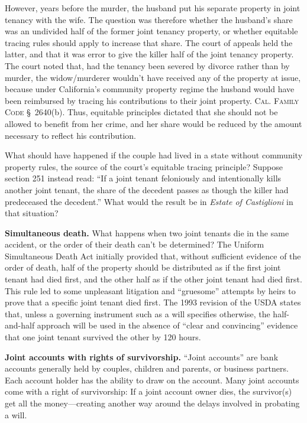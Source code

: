However, years before the murder, the husband put his separate property in joint
tenancy with the wife. The question was therefore whether the husband's share
was an undivided half of the former joint tenancy property, or whether
equitable tracing rules should apply to increase that share. The court of
appeals held the latter, and that it was error to give the killer half of the
joint tenancy property. The court noted that, had the tenancy been severed by
divorce rather than by murder, the widow/murderer wouldn't have received any of
the property at issue, because under California's community property regime the
husband would have been reimbursed by tracing his contributions to their joint
property. \textsc{Cal. Family Code} \S~2640(b). Thus, equitable principles
dictated that she should not be allowed to benefit from her crime, and her share
would be reduced by the amount necessary to reflect his contribution.



What should have happened if the couple had lived in a state without community
property rules, the source of the court's equitable tracing principle? Suppose
section 251 instead read: ``If a joint tenant feloniously and intentionally
kills another joint tenant, the share of the decedent passes as though the
killer had predeceased the decedent.'' What would the result be in
\textit{Estate of Castiglioni} in that situation?



\item \textbf{Simultaneous death.} What happens when two joint tenants die in
the same accident, or the order of their death can't be determined? The
Uniform Simultaneous Death Act initially provided that, without sufficient
evidence of the order of death, half of the property should be distributed as
if the first joint tenant had died first, and the other half as if the other
joint tenant had died first. This rule led to some unpleasant litigation and
``gruesome'' attempts by heirs to prove that a specific joint tenant died
first. The 1993 revision of the USDA states that, unless a governing
instrument such as a will specifies otherwise, the half-and-half approach will
be used in the absence of ``clear and convincing'' evidence that one joint
tenant survived the other by 120 hours.


\item \textbf{Joint accounts with rights of survivorship.} ``Joint accounts''
are bank accounts generally held by couples, children and parents, or business
partners. Each account holder has the ability to draw on the account. Many
joint accounts come with a right of survivorship: If a joint account owner
dies, the survivor(s) get all the money---creating another way around the
delays involved in probating a will.


